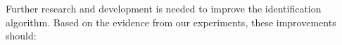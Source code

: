     Further research and development is needed to improve the
      identification algorithm.
    Based on the evidence from our experiments, these improvements
      should:
    \begin{enumerate}





\end{enumerate}
